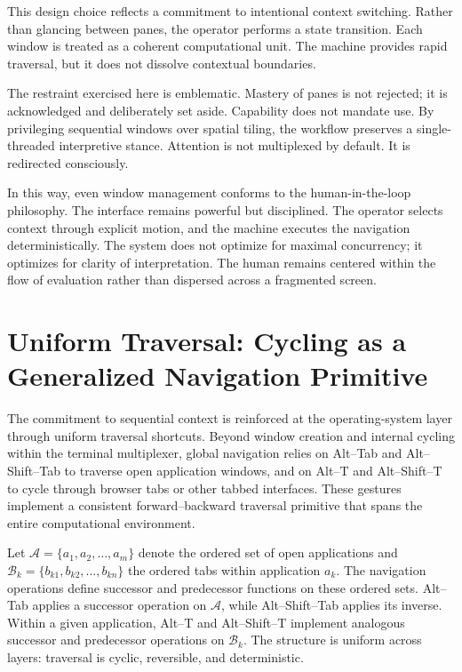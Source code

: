 \documentclass[11pt]{article}
\begin{document}
This design choice reflects a commitment to intentional context switching. Rather than glancing between panes, the operator performs a state transition. Each window is treated as a coherent computational unit. The machine provides rapid traversal, but it does not dissolve contextual boundaries.

The restraint exercised here is emblematic. Mastery of panes is not rejected; it is acknowledged and deliberately set aside. Capability does not mandate use. By privileging sequential windows over spatial tiling, the workflow preserves a single-threaded interpretive stance. Attention is not multiplexed by default. It is redirected consciously.

In this way, even window management conforms to the human-in-the-loop philosophy. The interface remains powerful but disciplined. The operator selects context through explicit motion, and the machine executes the navigation deterministically. The system does not optimize for maximal concurrency; it optimizes for clarity of interpretation. The human remains centered within the flow of evaluation rather than dispersed across a fragmented screen.

\section{Uniform Traversal: Cycling as a Generalized Navigation Primitive}

The commitment to sequential context is reinforced at the operating-system layer through uniform traversal shortcuts. Beyond window creation and internal cycling within the terminal multiplexer, global navigation relies on Alt–Tab and Alt–Shift–Tab to traverse open application windows, and on Alt–T and Alt–Shift–T to cycle through browser tabs or other tabbed interfaces. These gestures implement a consistent forward–backward traversal primitive that spans the entire computational environment.

Let \( \mathcal{A} = \{a_1, a_2, \dots, a_m\} \) denote the ordered set of open applications and \( \mathcal{B}_k = \{b_{k1}, b_{k2}, \dots, b_{kn}\} \) the ordered tabs within application \(a_k\). The navigation operations define successor and predecessor functions on these ordered sets. Alt–Tab applies a successor operation on \( \mathcal{A} \), while Alt–Shift–Tab applies its inverse. Within a given application, Alt–T and Alt–Shift–T implement analogous successor and predecessor operations on \( \mathcal{B}_k \). The structure is uniform across layers: traversal is cyclic, reversible, and deterministic.
\end{document}
